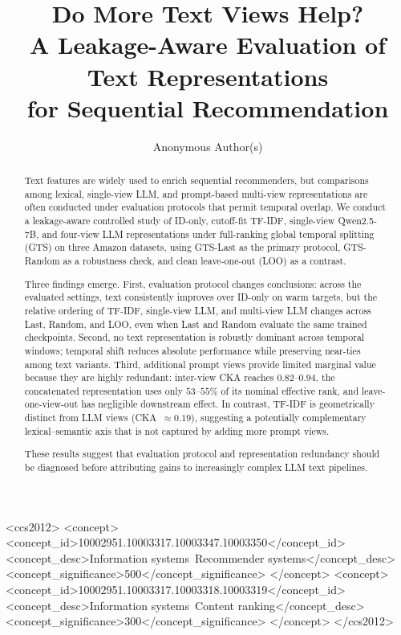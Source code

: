 \documentclass[sigconf,natbib=true,anonymous]{acmart}
\newcommand{\tfidf}{\textsc{TF-IDF}\xspace}
\newcommand{\llm}{\textsc{LLM}\xspace}
\begin{document}
\title{Do More Text Views Help?\\
A Leakage-Aware Evaluation of Text Representations\\
for Sequential Recommendation}

\author{Anonymous Author(s)}
\renewcommand{\shortauthors}{Anonymous}

\begin{abstract}
Text features are widely used to enrich sequential recommenders, but comparisons among lexical, single-view LLM, and prompt-based multi-view representations are often conducted under evaluation protocols that permit temporal overlap.
We conduct a leakage-aware controlled study of ID-only, cutoff-fit \tfidf, single-view Qwen2.5-7B, and four-view \llm representations under full-ranking global temporal splitting (GTS) on three Amazon datasets, using GTS-Last as the primary protocol, GTS-Random as a robustness check, and clean leave-one-out (LOO) as a contrast.

Three findings emerge.
First, evaluation protocol changes conclusions: across the evaluated settings, text consistently improves over ID-only on warm targets, but the relative ordering of \tfidf, single-view \llm, and multi-view \llm changes across Last, Random, and LOO, even when Last and Random evaluate the same trained checkpoints.
Second, no text representation is robustly dominant across temporal windows; temporal shift reduces absolute performance while preserving near-ties among text variants.
Third, additional prompt views provide limited marginal value because they are highly redundant: inter-view CKA reaches $0.82$--$0.94$, the concatenated representation uses only $53$--$55\%$ of its nominal effective rank, and leave-one-view-out has negligible downstream effect.
In contrast, \tfidf is geometrically distinct from \llm views (CKA~$\approx 0.19$), suggesting a potentially complementary lexical--semantic axis that is not captured by adding more prompt views.

These results suggest that evaluation protocol and representation redundancy should be diagnosed before attributing gains to increasingly complex LLM text pipelines.
\end{abstract}

\begin{CCSXML}
<ccs2012>
 <concept>
  <concept_id>10002951.10003317.10003347.10003350</concept_id>
  <concept_desc>Information systems~Recommender systems</concept_desc>
  <concept_significance>500</concept_significance>
 </concept>
 <concept>
  <concept_id>10002951.10003317.10003318.10003319</concept_id>
  <concept_desc>Information systems~Content ranking</concept_desc>
  <concept_significance>300</concept_significance>
 </concept>
</ccs2012>
\end{CCSXML}
\end{document}

